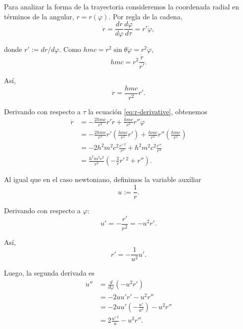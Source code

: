 \documentclass[letterpaper,11pt]{article}
\begin{document}
Para analizar la forma de la trayectoria consideremos  la coordenada radial en términos de la angular, $r = r(\varphi)$. Por regla de la cadena,
\begin{equation}
\dot{r} = \frac{dr}{d\varphi} \frac{d\varphi}{d\tau} = r' \dot{\varphi},
\end{equation}

donde $r' := dr/d\varphi$. Como $hmc = r^2 \sin\theta \dot{\varphi} = r^2 \dot{\varphi}$, 
\begin{equation}
hmc = r^2 \frac{\dot{r}}{r'}.
\end{equation}

Así,
\begin{equation} \label{eq:r-derivative}
\dot{r} = \frac{hmc}{r^2} r'.
\end{equation}

Derivando con respecto a $\tau$ la ecuación \eqref{eq:r-derivative}, obtenemos
\begin{align}
\ddot{r} &= - \frac{2 hmc}{r^3} r' \dot{r} + \frac{hmc}{r^2} r'' \dot{\varphi} \nonumber \\
&= - \frac{2 hmc}{r^3} r' \left( \frac{hmc}{r^2} r' \right) + \frac{hmc}{r^2} r'' \left( \frac{hmc}{r^2} \right) \nonumber \\
&= - 2 h^2m^2c^2 \frac{r'\,^2}{r^5} + h^2m^2c^2 \frac{r''}{r^4}\nonumber  \\
&= \frac{h^2m^2c^2}{r^2} \left( - \frac{2}{r} r'\,^2 + r'' \right). \label{eq:r-second-derivative}
\end{align}

Al igual que en el caso newtoniano, definimos la variable auxiliar
\begin{equation} \label{eq:def-u}
u := \frac{1}{r}.
\end{equation}

Derivando con respecto a $\varphi$:
\begin{equation}
u' = - \frac{r'}{r^2} = - u^2 r'.
\end{equation}

Así,
\begin{equation} \label{eq:derivative-u}
r' = - \frac{1}{u^2} u'.
\end{equation}

Luego, la segunda derivada es
\begin{align}
u'' &= \frac{d}{d\varphi} (-u^2 r') \nonumber \\
&= -2 u u' r' - u^2 r'' \nonumber \\
&=  -2 u u' \left(- \frac{u'}{u^2} \right) - u^2 r'' \nonumber \\
&= 2 \frac{u'\,^2}{u} - u^2 r''.
\end{align}
\end{document}
